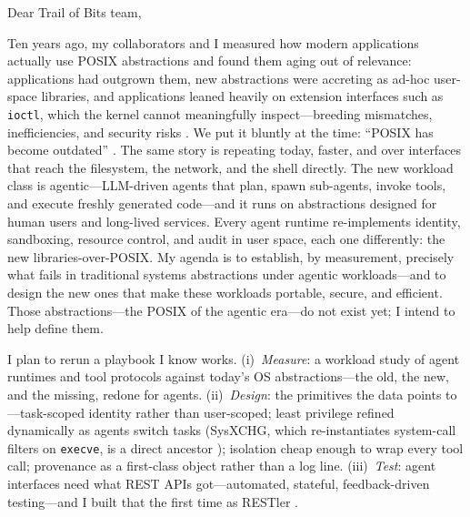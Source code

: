 


\vspace{2pt}


Dear Trail of Bits team,

Ten years ago, my collaborators and I measured how modern applications actually
use POSIX abstractions and found them aging out of relevance: applications had
outgrown them, new abstractions were accreting as ad-hoc user-space libraries, and
applications leaned heavily on extension interfaces such as \texttt{ioctl}, which
the kernel cannot meaningfully inspect---breeding mismatches, inefficiencies, and
security risks . We put it bluntly at the time: ``POSIX has
become outdated'' . The same story is repeating
today, faster, and over interfaces that reach the filesystem, the network, and the
shell directly. The new workload class is
agentic---LLM-driven agents that plan, spawn sub-agents, invoke tools, and
execute freshly generated code---and it runs on abstractions designed for human
users and long-lived services. Every agent runtime re-implements identity,
sandboxing, resource control, and audit in user space, each one differently:
the new libraries-over-POSIX. My agenda is to establish, by measurement,
precisely what fails in traditional systems abstractions under agentic
workloads---and to design the new ones that make these workloads portable,
secure, and efficient. Those abstractions---the POSIX of the agentic era---do
not exist yet; I intend to help define them.

 I plan to rerun a playbook I know works.
(i)~\emph{Measure}: a workload study of agent runtimes and tool protocols
against today's OS abstractions---the old, the new, and the missing, redone
for agents.
(ii)~\emph{Design}: the primitives the data points to---task-scoped identity
rather than user-scoped; least privilege refined dynamically as agents switch
tasks (SysXCHG, which re-instantiates system-call filters on \texttt{execve},
is a direct ancestor ); isolation cheap enough to wrap every
tool call; provenance as a first-class object rather than a log line.
(iii)~\emph{Test}: agent interfaces need what REST APIs got---automated,
stateful, feedback-driven testing---and I built that the first time as RESTler
.

